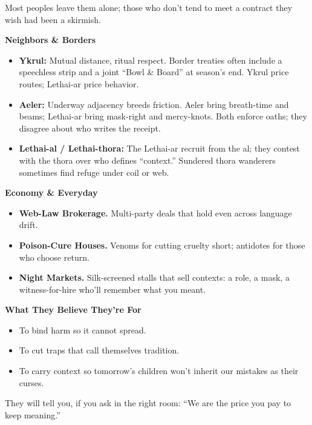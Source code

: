 \documentclass[11pt]{article}
\begin{document}
  Most peoples leave them alone; those who don't tend to meet a contract they wish had been a skirmish.
  
  \bigskip
  
  \textbf{Neighbors \& Borders}
  \begin{itemize}
  \item \textbf{Ykrul:} Mutual distance, ritual respect. Border treaties often include a speechless strip and a joint ``Bowl \& Board'' at season's end. Ykrul price routes; Lethai-ar price behavior.
  \item \textbf{Aeler:} Underway adjacency breeds friction. Aeler bring breath-time and beams; Lethai-ar bring mask-right and mercy-knots. Both enforce oaths; they disagree about who writes the receipt.
  \item \textbf{Lethai-al / Lethai-thora:} The Lethai-ar recruit from the al; they contest with the thora over who defines ``context.'' Sundered thora wanderers sometimes find refuge under coil or web.
  \end{itemize}
  
  \bigskip
  
  \textbf{Economy \& Everyday}
  \begin{itemize}
  \item \textbf{Web-Law Brokerage.} Multi-party deals that hold even across language drift.
  \item \textbf{Poison-Cure Houses.} Venoms for cutting cruelty short; antidotes for those who choose return.
  \item \textbf{Night Markets.} Silk-screened stalls that sell contexts: a role, a mask, a witness-for-hire who'll remember what you meant.
  \end{itemize}
  
  \bigskip
  
  \textbf{What They Believe They're For}
  \begin{itemize}
  \item To bind harm so it cannot spread.
  \item To cut traps that call themselves tradition.
  \item To carry context so tomorrow's children won't inherit our mistakes as their curses.
  \end{itemize}
  
  They will tell you, if you ask in the right room: ``We are the price you pay to keep meaning.''
  
  \bigskip
  
\end{document}
